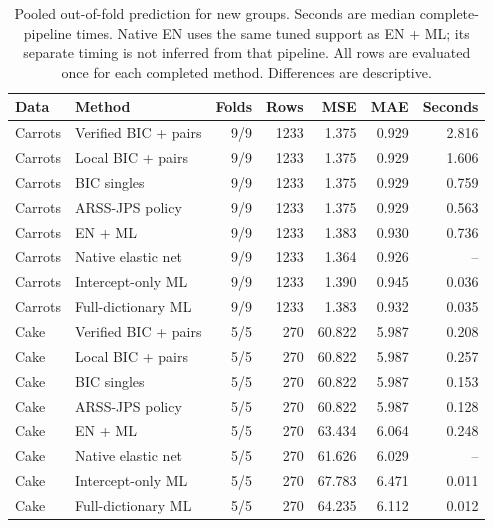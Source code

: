 \begin{table}[H]\centering\small
\begin{tabular}{llrrrrr}\toprule
Data & Method & Folds & Rows & MSE & MAE & Seconds\\\midrule
Carrots & Verified BIC + pairs & 9/9 & 1233 & 1.375 & 0.929 & 2.816 \\
Carrots & Local BIC + pairs & 9/9 & 1233 & 1.375 & 0.929 & 1.606 \\
Carrots & BIC singles & 9/9 & 1233 & 1.375 & 0.929 & 0.759 \\
Carrots & ARSS-JPS policy & 9/9 & 1233 & 1.375 & 0.929 & 0.563 \\
Carrots & EN + ML & 9/9 & 1233 & 1.383 & 0.930 & 0.736 \\
Carrots & Native elastic net & 9/9 & 1233 & 1.364 & 0.926 & -- \\
Carrots & Intercept-only ML & 9/9 & 1233 & 1.390 & 0.945 & 0.036 \\
Carrots & Full-dictionary ML & 9/9 & 1233 & 1.383 & 0.932 & 0.035 \\
\midrule
Cake & Verified BIC + pairs & 5/5 & 270 & 60.822 & 5.987 & 0.208 \\
Cake & Local BIC + pairs & 5/5 & 270 & 60.822 & 5.987 & 0.257 \\
Cake & BIC singles & 5/5 & 270 & 60.822 & 5.987 & 0.153 \\
Cake & ARSS-JPS policy & 5/5 & 270 & 60.822 & 5.987 & 0.128 \\
Cake & EN + ML & 5/5 & 270 & 63.434 & 6.064 & 0.248 \\
Cake & Native elastic net & 5/5 & 270 & 61.626 & 6.029 & -- \\
Cake & Intercept-only ML & 5/5 & 270 & 67.783 & 6.471 & 0.011 \\
Cake & Full-dictionary ML & 5/5 & 270 & 64.235 & 6.112 & 0.012 \\
\bottomrule\end{tabular}
\caption{Pooled out-of-fold prediction for new groups. Seconds are median
complete-pipeline times. Native EN uses the same tuned support as EN + ML;
its separate timing is not inferred from that pipeline. All rows are evaluated
once for each completed method. Differences are descriptive.}\label{tab:real}
\end{table}
